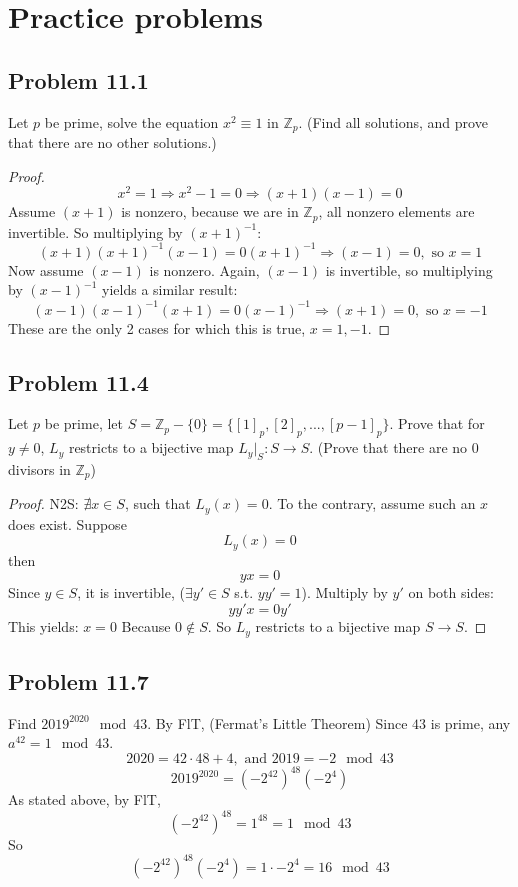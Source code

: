 \documentclass[12pt]{article}
\title{\scalebox{2}{Math 341 Homework 11}}
\author{\scalebox{1.5}{Theo Koss}}
\date{November 2020}
\newcommand{\Z}{\mathbb{Z}}
\begin{document}
\maketitle
\section{Practice problems}
\subsection{Problem 11.1}
Let $p$ be prime, solve the equation $x^2\equiv1$ in $\Z_p$. (Find all solutions, and prove that there are no other solutions.)
\begin{proof}
$$x^2=1\Longrightarrow x^2-1=0\Longrightarrow(x+1)(x-1)=0$$ Assume $(x+1)$ is nonzero, because we are in $\Z_p$, all nonzero elements are invertible. So multiplying by $(x+1)^{-1}$: $$(x+1)(x+1)^{-1}(x-1)=0(x+1)^{-1}\Longrightarrow(x-1)=0,\text{ so }x=1$$ Now assume $(x-1)$ is nonzero. Again, $(x-1)$ is invertible, so multiplying by $(x-1)^{-1}$ yields a similar result:$$(x-1)(x-1)^{-1}(x+1)=0(x-1)^{-1}\Longrightarrow(x+1)=0,\text{ so }x=-1$$ These are the only 2 cases for which this is true, $x=1,-1$.
\end{proof}
\subsection{Problem 11.4}
Let $p$ be prime, let $S=\Z_p-\{0\}=\{[1]_p,[2]_p,...,[p-1]_p\}$. Prove that for $y\neq0$, $L_y$ restricts to a bijective map $L_y|_S:S\to S$. (Prove that there are no 0 divisors in $\Z_p$)
\begin{proof}
N2S: $\nexists x\in S$, such that $L_y(x)=0$. To the contrary, assume such an $x$ does exist. \newline Suppose $$L_y(x)=0$$ then $$yx=0$$ Since $y\in S$, it is invertible, ($\exists y'\in S$ s.t. $yy'=1$). Multiply by $y'$ on both sides: $$yy'x=0y'$$ This yields: $x=0$ \scalebox{1.5}{\Lightning} Because $0\notin S$. So $L_y$ restricts to a bijective map $S\to S$.
\end{proof}
\subsection{Problem 11.7}
Find $2019^{2020}\mod{43}$.
\newline By FlT, (Fermat's Little Theorem) Since $43$ is prime, any $a^{42}=1\mod{43}$. $$2020=42\cdot48+4,\text{ and }2019=-2\mod{43}$$ $$2019^{2020}=(-2^{42})^{48}(-2^4)$$ As stated above, by FlT, $$(-2^{42})^{48}=1^{48}=1\mod{43}$$ So $$(-2^{42})^{48}(-2^4)=1\cdot-2^4=16\mod{43}$$
\end{document}
